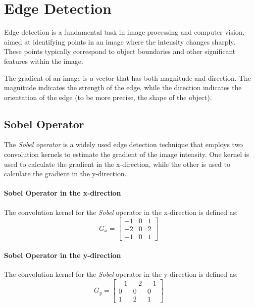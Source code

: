 \section{Edge Detection}
\label{sec:edge-detection}

Edge detection is a fundamental task in image processing and computer vision, aimed at identifying points in an image where the intensity changes sharply. These points typically correspond to object boundaries and other significant features within the image.

The gradient of an image is a vector that has both magnitude and direction. The magnitude indicates the strength of the edge, while the direction indicates the orientation of the edge (to be more precise, the shape of the object).

\subsection{Sobel Operator}
\label{subsec:sobel-operator}

The \emph{Sobel operator} is a widely used edge detection technique that employs two convolution kernels to estimate the gradient of the image intensity. One kernel is used to calculate the gradient in the x-direction, while the other is used to calculate the gradient in the y-direction.

\paragraph{Sobel Operator in the x-direction}
The convolution kernel for the \emph{Sobel} operator in the x-direction is defined as:
\begin{equation}
    G_x =
    \begin{bmatrix}
        -1 & 0 & 1 \\
        -2 & 0 & 2 \\
        -1 & 0 & 1
    \end{bmatrix}
    \label{eq:sobel_x}
\end{equation}

\paragraph{Sobel Operator in the y-direction}
The convolution kernel for the \emph{Sobel} operator in the y-direction is defined as:
\begin{equation}
    G_y =
    \begin{bmatrix}
        -1 & -2 & -1 \\
        0  & 0  & 0  \\
        1  & 2  & 1
    \end{bmatrix}
    \label{eq:sobel_y}
\end{equation}

